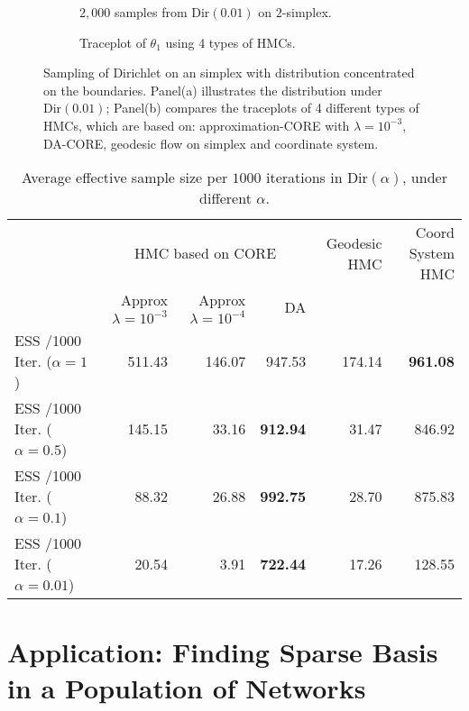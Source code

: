 \documentclass[10pt,fleqn]{article}
\DeclareMathOperator{\1}{\mathbbm{1}}
\begin{document}
\begin{figure}[H]
\begin{subfigure}[b]{0.45\textwidth}
\caption{$2,000$ samples from $\text{Dir}(0.01)$ on $2$-simplex.}
\end{subfigure}
\begin{subfigure}[b]{0.45\textwidth}
\caption{Traceplot of $\theta_1$ using 4 types of HMCs.}
\end{subfigure}
\caption{Sampling of Dirichlet on an simplex with distribution concentrated on the boundaries.
Panel(a) illustrates the distribution under $\text{Dir}(0.01)$; Panel(b)
compares the traceplots of 4 different types of HMCs, which are based on: approximation-CORE with $\lambda=10^{-3}$, DA-CORE, geodesic flow on simplex \citep{byrne2013geodesic} and coordinate
system.}
\label{simplex}
\end{figure}


   \begin{table}[H]
     
   \begin{center}
   \tiny
   \begin{tabular}{ l| r | r| r |r | r}
   \hline     
    & \multicolumn{3}{c|}{HMC based on CORE}     & Geodesic HMC  & Coord
    System HMC \\   
        & {Approx $\lambda=10^{-3}$} & {Approx $\lambda=10^{-4}$}      & DA
        &  \\  \hline         
   ESS /1000 Iter. ($\alpha=1$) & 511.43   & 146.07  & 947.53 &  174.14
   & \bf 961.08     \\
      ESS /1000 Iter. ($\alpha=0.5$) & 145.15  & 33.16  &\bf  912.94  & 31.47  & 846.92   \\
            ESS /1000 Iter. ($\alpha=0.1$) &  88.32   & 26.88& \bf 992.75  &28.70  & 875.83    \\
   ESS /1000 Iter. ($\alpha=0.01$) & 20.54 & 3.91 & {\bf 722.44} & 17.26  & 128.55  \\
   \hline  
   \end{tabular}
   \end{center}
   \caption{Average effective sample size per $1000$ iterations in $\text{Dir}(\alpha)$,
   under different $\alpha$. \label{simplex_tb}
}
   \end{table}

   \section{Application: Finding Sparse Basis in a Population of Networks}
\end{document}
